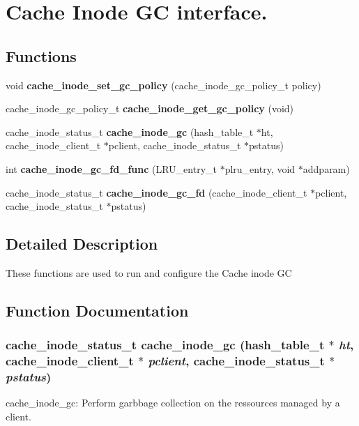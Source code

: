 \section{Cache Inode GC interface.}
\label{group__Cache__inode__gc__interface}
\subsection*{Functions}
\begin{DoxyCompactItemize}
\item 
void {\bf cache\_\-inode\_\-set\_\-gc\_\-policy} (cache\_\-inode\_\-gc\_\-policy\_\-t policy)
\item 
cache\_\-inode\_\-gc\_\-policy\_\-t {\bf cache\_\-inode\_\-get\_\-gc\_\-policy} (void)
\item 
cache\_\-inode\_\-status\_\-t {\bf cache\_\-inode\_\-gc} (hash\_\-table\_\-t $\ast$ht, cache\_\-inode\_\-client\_\-t $\ast$pclient, cache\_\-inode\_\-status\_\-t $\ast$pstatus)
\item 
int {\bf cache\_\-inode\_\-gc\_\-fd\_\-func} (LRU\_\-entry\_\-t $\ast$plru\_\-entry, void $\ast$addparam)
\item 
cache\_\-inode\_\-status\_\-t {\bf cache\_\-inode\_\-gc\_\-fd} (cache\_\-inode\_\-client\_\-t $\ast$pclient, cache\_\-inode\_\-status\_\-t $\ast$pstatus)
\end{DoxyCompactItemize}


\subsection{Detailed Description}
These functions are used to run and configure the Cache inode GC 

\subsection{Function Documentation}
\subsubsection[{cache\_\-inode\_\-gc}]{\setlength{\rightskip}{0pt plus 5cm}cache\_\-inode\_\-status\_\-t cache\_\-inode\_\-gc (hash\_\-table\_\-t $\ast$ {\em ht}, \/  cache\_\-inode\_\-client\_\-t $\ast$ {\em pclient}, \/  cache\_\-inode\_\-status\_\-t $\ast$ {\em pstatus})}\label{group__Cache__inode__gc__interface_ga2c07f75a5a24f519e42b34e8718bf79b}
cache\_\-inode\_\-gc: Perform garbbage collection on the ressources managed by a client.

